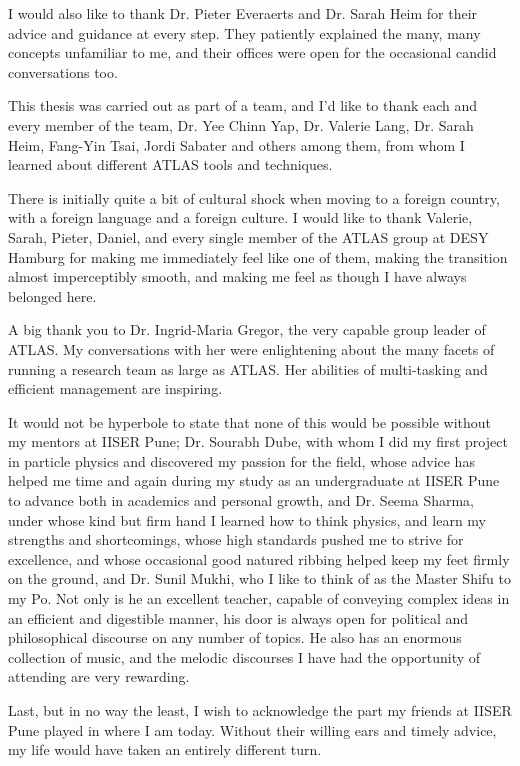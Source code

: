 \documentclass[12pt,a4paper,openright,twoside]{report}
\begin{document}
I would also like to thank Dr. Pieter Everaerts and Dr. Sarah Heim for their advice and guidance at every step. They patiently explained the many, many concepts unfamiliar to me, and their offices were open for the occasional candid conversations too.

This thesis was carried out as part of a team, and I'd like to thank each and every member of the team, Dr. Yee Chinn Yap, Dr. Valerie Lang, Dr. Sarah Heim, Fang-Yin Tsai, Jordi Sabater and others among them, from whom I learned about different ATLAS tools and techniques.

There is initially quite a bit of cultural shock when moving to a foreign country, with a foreign language and a foreign culture. I would like to thank Valerie, Sarah, Pieter, Daniel, and every single member of the ATLAS group at DESY Hamburg for making me immediately feel like one of them, making the transition almost imperceptibly smooth, and making me feel as though I have always belonged here.

A big thank you to Dr. Ingrid-Maria Gregor, the very capable group leader of ATLAS. My conversations with her were enlightening about the many facets of running a research team as large as ATLAS. Her abilities of multi-tasking and efficient management are inspiring.

It would not be hyperbole to state that none of this would be possible without my mentors at IISER Pune; Dr. Sourabh Dube, with whom I did my first project in particle physics and discovered my passion for the field, whose advice has helped me time and again during my study as an undergraduate at IISER Pune to advance both in academics and personal growth, and Dr. Seema Sharma, under whose kind but firm hand I learned how to think physics, and learn my strengths and shortcomings, whose high standards pushed me to strive for excellence, and whose occasional good natured ribbing helped keep my feet firmly on the ground, and Dr. Sunil Mukhi, who I like to think of as the Master Shifu to my Po. Not only is he an excellent teacher, capable of conveying complex ideas in an efficient and digestible manner, his door is always open for political and philosophical discourse on any number of topics. He also has an enormous collection of music, and the melodic discourses I have had the opportunity of attending are very rewarding.

Last, but in no way the least, I wish to acknowledge the part my friends at IISER Pune played in where I am today. Without their willing ears and timely advice, my life would have taken an entirely different turn.
\end{document}
